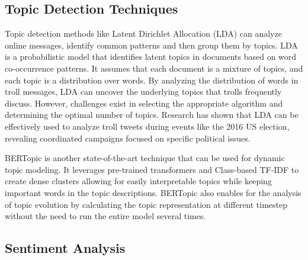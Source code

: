 \documentclass[twoside]{ctuthesis}
\theoremstyle{plain}
\theoremstyle{definition}
\theoremstyle{note}
\begin{document}
\section{Topic Detection Techniques}

Topic detection methods like Latent Dirichlet Allocation (LDA) can analyze online messages, identify common patterns and then group them by topics. LDA is a probabilistic model that identifies latent topics in documents based on word co-occurrence patterns.\cite{Blei2001LDA} It assumes that each document is a mixture of topics, and each topic is a distribution over words. By analyzing the distribution of words in troll messages, LDA can uncover the underlying topics that trolls frequently discuss. However, challenges exist in selecting the appropriate algorithm and determining the optimal number of topics.\cite{Ruediger2022TopicModellingRevisited} Research has shown that LDA can be effectively used to analyze troll tweets during events like the 2016 US election, revealing coordinated campaigns focused on specific political issues.\cite{Golino2022Elections}

BERTopic is another state-of-the-art technique that can be used for dynamic topic modeling. It leverages pre-trained transformers and Class-based TF-IDF to create dense clusters allowing for easily interpretable topics while keeping important words in the topic descriptions. BERTopic also enables for the analysis of topic evolution by calculating the topic representation at different timestep without the need to run the entire model several times.\cite{Grootendorst2022BERTopic}

\section{Sentiment Analysis}


\chapter{}



\appendix

\printindex



\end{document}
